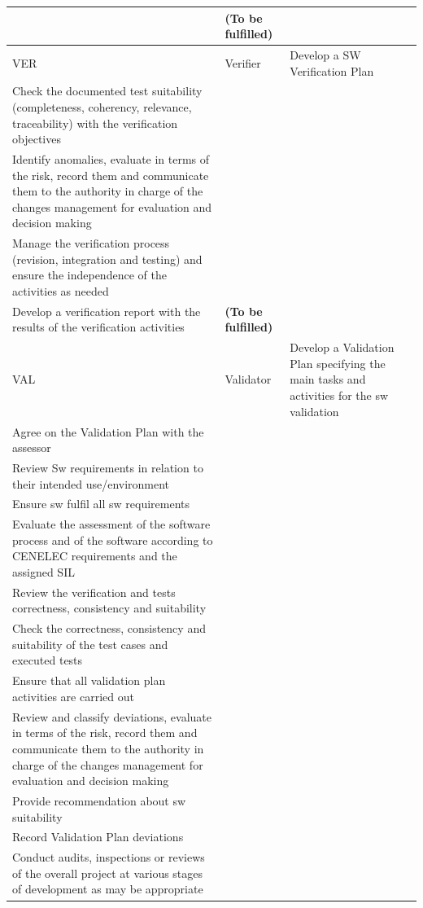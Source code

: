 \documentclass{template/openetcs_article}
\begin{document}
\begin{landscape}
\begin{flushleft}
\begin{supertabular}[H]{|m{1cm}|m{2,5cm}|m{15,5cm}|m{6cm}|}
&
\textbf{(To be fulfilled)}
\\\hline
VER &
Verifier &
\raggedright
Develop a SW Verification Plan \citep{verification}\\
Check the documented test suitability (completeness, coherency, relevance, traceability) with the verification objectives\\
Identify anomalies, evaluate in terms of the risk, record them and communicate them to the authority in charge of the changes management for evaluation and decision making\\
Manage the verification process (revision, integration and testing) and ensure the independence of the activities as needed\\
Develop a verification report with the results of the verification activities &
\textbf{(To be fulfilled)}
\\\hline
VAL &
Validator &
\raggedright
Develop a Validation Plan specifying the main tasks and activities for the sw validation\\
Agree on the Validation Plan with the assessor\\
Review Sw requirements in relation to their intended use/environment\\
Ensure sw fulfil all sw requirements\\
Evaluate the assessment of the software process and of the software according to CENELEC requirements and the assigned SIL\\
Review the verification and tests correctness, consistency and suitability \\
Check the correctness, consistency and suitability of the test cases and executed tests\\
Ensure that all validation plan activities are carried out\\
Review and classify deviations, evaluate in terms of the risk, record them and communicate them to the authority in charge of the changes management for evaluation and decision making\\ 
Provide recommendation about sw suitability\\
Record Validation Plan deviations\\
Conduct audits, inspections or reviews of the overall project at various stages of development as may be appropriate\\

\end{supertabular}
\end{flushleft}
\end{landscape}
\end{document}
